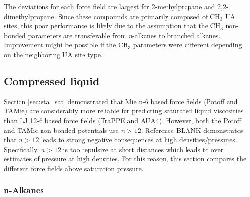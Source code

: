 \documentclass[preprint,review,12pt]{elsarticle}
\begin{document}
	
	The deviations for each force field are largest for 2-methylpropane and 2,2-dimethylpropane. Since these compounds are primarily composed of CH$_3$ UA sites, this poor performance is likely due to the assumption that the CH$_3$ non-bonded parameters are transferable from \textit{n}-alkanes to branched alkanes. Improvement might be possible if the CH$_3$ parameters were different depending on the neighboring UA site type.
	
	\subsection{Compressed liquid} \label{sec:T293highP}
	
	Section \ref{sec:eta_sat} demonstrated that Mie n-6 based force fields (Potoff and TAMie) are considerably more reliable for predicting saturated liquid viscosities than LJ 12-6 based force fields (TraPPE and AUA4). However, both the Potoff and TAMie non-bonded potentials use $n > 12$. Reference BLANK demonstrates that $n > 12$ leads to strong negative consequences at high densities/pressures. Specifically, $n > 12$ is too repulsive at short distances which leads to over estimates of pressure at high densities. For this reason, this section compares the different force fields above saturation pressure.
	
	\subsubsection{n-Alkanes}
	
	
	
\end{document}
